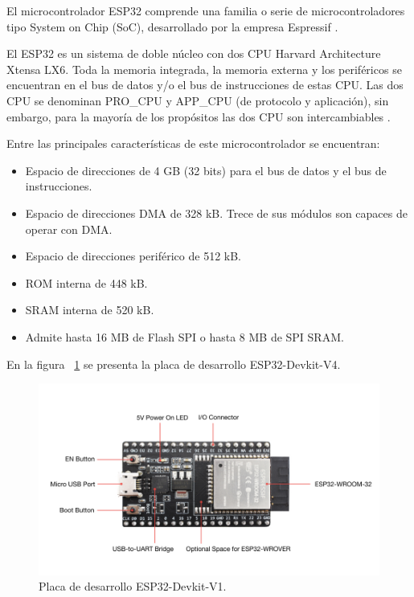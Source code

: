El microcontrolador ESP32 comprende una familia o serie de microcontroladores tipo System on Chip (SoC), desarrollado por la empresa Espressif \citep{ESPRESSIF}. 

El ESP32 es un sistema de doble núcleo con dos CPU Harvard Architecture Xtensa LX6. Toda la memoria integrada, la memoria externa y los periféricos se encuentran en el bus de datos y/o el bus de instrucciones de estas CPU. Las dos CPU se denominan PRO\_CPU y APP\_CPU (de protocolo y aplicación), sin embargo, para la mayoría de los propósitos las dos CPU son intercambiables \citep{ESPRESSIF}.

Entre las principales características de este microcontrolador se encuentran:

\begin{itemize}
    \item Espacio de direcciones de 4 GB (32 bits) para el bus de datos y el bus de instrucciones. 
    \item Espacio de direcciones DMA de 328 kB. Trece de sus módulos son capaces de operar con DMA.
    \item Espacio de direcciones periférico de 512 kB.
    \item ROM interna de 448 kB.
    \item SRAM interna de 520 kB.
    \item Admite hasta 16 MB de Flash SPI o hasta 8 MB de SPI SRAM.    
\end{itemize}

En la figura ~\ref{fig:ESP32} se presenta la placa de desarrollo ESP32-Devkit-V4.

\vspace{1cm}

\begin{figure}[htbp]
	\centering
	\includegraphics[width=1\textwidth]{./Figures/ESP32.jpg}
	\caption{Placa de desarrollo ESP32-Devkit-V1\protect\footnotemark.}
        
	\label{fig:ESP32}
\end{figure}

